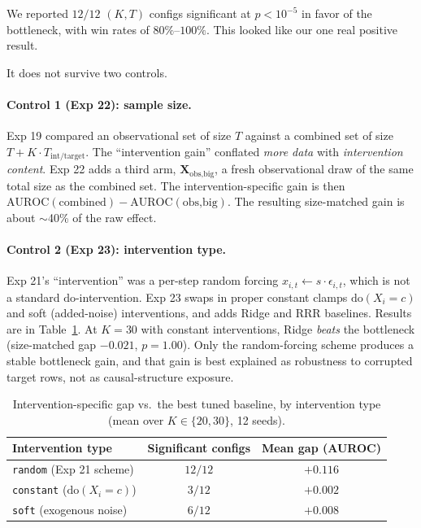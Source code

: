 \documentclass{article}
\begin{document}
We reported $12 / 12$ $(K, T)$ configs significant at
$p < 10^{-5}$ in favor of the bottleneck, with win rates of
$80\%$–$100\%$. This looked like our one real positive result.

It does not survive two controls.

\paragraph{Control 1 (Exp 22): sample size.}
Exp 19 compared an observational set of size $T$ against a combined
set of size $T + K \cdot T_{\text{int/target}}$. The
``intervention gain'' conflated \emph{more data} with
\emph{intervention content}. Exp 22 adds a third arm,
$\mathbf{X}_{\text{obs,big}}$, a fresh observational draw of the same
total size as the combined set. The intervention-specific gain is
then $\text{AUROC}(\text{combined}) -
\text{AUROC}(\text{obs,big})$. The resulting size-matched gain is
about $\sim$40\% of the raw effect.

\paragraph{Control 2 (Exp 23): intervention type.}
Exp 21's ``intervention'' was a per-step random forcing
$x_{i,t} \leftarrow s \cdot \epsilon_{i,t}$, which is not a standard
$\text{do}$-intervention. Exp 23 swaps in proper constant clamps
$\text{do}(X_i = c)$ and soft (added-noise) interventions, and adds
Ridge and RRR baselines. Results are in Table~\ref{tab:int_type}.
At $K=30$ with constant interventions, Ridge \emph{beats} the
bottleneck (size-matched gap $-0.021$, $p = 1.00$). Only the
random-forcing scheme produces a stable bottleneck gain, and that
gain is best explained as robustness to corrupted target rows, not
as causal-structure exposure.

\begin{table}[t]
\centering
\small
\caption{Intervention-specific gap vs.\ the best tuned baseline,
by intervention type (mean over $K \in \{20, 30\}$, 12 seeds).}
\label{tab:int_type}
\begin{tabular}{lcc}
\toprule
Intervention type & Significant configs & Mean gap (AUROC) \\
\midrule
\texttt{random} (Exp 21 scheme) & $12/12$ & $+0.116$ \\
\texttt{constant} ($\text{do}(X_i = c)$) & $3/12$ & $+0.002$ \\
\texttt{soft} (exogenous noise) & $6/12$ & $+0.008$ \\
\bottomrule
\end{tabular}
\end{table}
\end{document}
